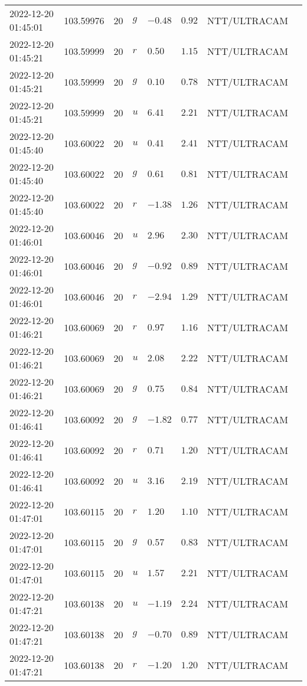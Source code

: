 \documentclass{nature_plusfigure}
\begin{document}
\begin{supplement}
\begin{center}
\begin{longtable}{llllllll}
2022-12-20 01:45:01 & 103.59976 & 20 & $g$ & $-0.48$ & $0.92$ & NTT/ULTRACAM &  \\ 
2022-12-20 01:45:21 & 103.59999 & 20 & $r$ & $0.50$ & $1.15$ & NTT/ULTRACAM &  \\ 
2022-12-20 01:45:21 & 103.59999 & 20 & $g$ & $0.10$ & $0.78$ & NTT/ULTRACAM &  \\ 
2022-12-20 01:45:21 & 103.59999 & 20 & $u$ & $6.41$ & $2.21$ & NTT/ULTRACAM &  \\ 
2022-12-20 01:45:40 & 103.60022 & 20 & $u$ & $0.41$ & $2.41$ & NTT/ULTRACAM &  \\ 
2022-12-20 01:45:40 & 103.60022 & 20 & $g$ & $0.61$ & $0.81$ & NTT/ULTRACAM &  \\ 
2022-12-20 01:45:40 & 103.60022 & 20 & $r$ & $-1.38$ & $1.26$ & NTT/ULTRACAM &  \\ 
2022-12-20 01:46:01 & 103.60046 & 20 & $u$ & $2.96$ & $2.30$ & NTT/ULTRACAM &  \\ 
2022-12-20 01:46:01 & 103.60046 & 20 & $g$ & $-0.92$ & $0.89$ & NTT/ULTRACAM &  \\ 
2022-12-20 01:46:01 & 103.60046 & 20 & $r$ & $-2.94$ & $1.29$ & NTT/ULTRACAM &  \\ 
2022-12-20 01:46:21 & 103.60069 & 20 & $r$ & $0.97$ & $1.16$ & NTT/ULTRACAM &  \\ 
2022-12-20 01:46:21 & 103.60069 & 20 & $u$ & $2.08$ & $2.22$ & NTT/ULTRACAM &  \\ 
2022-12-20 01:46:21 & 103.60069 & 20 & $g$ & $0.75$ & $0.84$ & NTT/ULTRACAM &  \\ 
2022-12-20 01:46:41 & 103.60092 & 20 & $g$ & $-1.82$ & $0.77$ & NTT/ULTRACAM &  \\ 
2022-12-20 01:46:41 & 103.60092 & 20 & $r$ & $0.71$ & $1.20$ & NTT/ULTRACAM &  \\ 
2022-12-20 01:46:41 & 103.60092 & 20 & $u$ & $3.16$ & $2.19$ & NTT/ULTRACAM &  \\ 
2022-12-20 01:47:01 & 103.60115 & 20 & $r$ & $1.20$ & $1.10$ & NTT/ULTRACAM &  \\ 
2022-12-20 01:47:01 & 103.60115 & 20 & $g$ & $0.57$ & $0.83$ & NTT/ULTRACAM &  \\ 
2022-12-20 01:47:01 & 103.60115 & 20 & $u$ & $1.57$ & $2.21$ & NTT/ULTRACAM &  \\ 
2022-12-20 01:47:21 & 103.60138 & 20 & $u$ & $-1.19$ & $2.24$ & NTT/ULTRACAM &  \\ 
2022-12-20 01:47:21 & 103.60138 & 20 & $g$ & $-0.70$ & $0.89$ & NTT/ULTRACAM &  \\ 
2022-12-20 01:47:21 & 103.60138 & 20 & $r$ & $-1.20$ & $1.20$ & NTT/ULTRACAM &  \\ 

\end{longtable}
\end{center}
\end{supplement}
\end{document}
